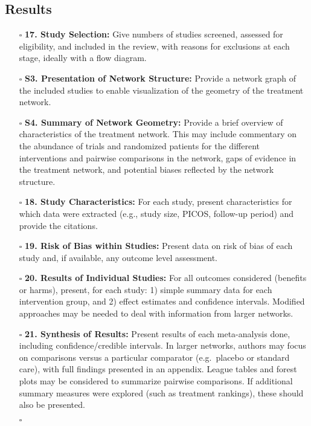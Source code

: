 \documentclass[11pt]{article}
\def\tightlist{}
\begin{document}
\begin{Form}
\subsection{Results}\label{results}

\begin{itemize}
\tightlist
\item[$\square$]
  \textbf{17. Study Selection:} Give numbers of studies screened,
  assessed for eligibility, and included in the review, with reasons for
  exclusions at each stage, ideally with a flow diagram.
\item[$\square$]
  \textbf{S3. Presentation of Network Structure:} Provide a network
  graph of the included studies to enable visualization of the geometry
  of the treatment network.
\item[$\square$]
  \textbf{S4. Summary of Network Geometry:} Provide a brief overview of
  characteristics of the treatment network. This may include commentary
  on the abundance of trials and randomized patients for the different
  interventions and pairwise comparisons in the network, gaps of
  evidence in the treatment network, and potential biases reflected by
  the network structure.
\item[$\square$]
  \textbf{18. Study Characteristics:} For each study, present
  characteristics for which data were extracted (e.g., study size,
  PICOS, follow-up period) and provide the citations.
\item[$\square$]
  \textbf{19. Risk of Bias within Studies:} Present data on risk of bias
  of each study and, if available, any outcome level assessment.
\item[$\square$]
  \textbf{20. Results of Individual Studies:} For all outcomes
  considered (benefits or harms), present, for each study: 1) simple
  summary data for each intervention group, and 2) effect estimates and
  confidence intervals. Modified approaches may be needed to deal with
  information from larger networks.
\item[$\square$]
  \textbf{21. Synthesis of Results:} Present results of each
  meta-analysis done, including confidence/credible intervals. In larger
  networks, authors may focus on comparisons versus a particular
  comparator (e.g.~placebo or standard care), with full findings
  presented in an appendix. League tables and forest plots may be
  considered to summarize pairwise comparisons. If additional summary
  measures were explored (such as treatment rankings), these should also
  be presented.
\item[$\square$]

\end{itemize}
\end{Form}
\end{document}
